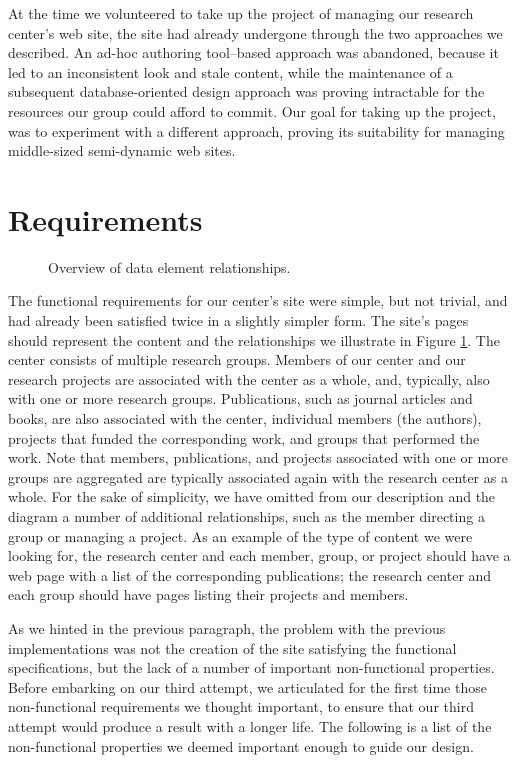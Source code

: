 \documentclass[10pt]{article}
\begin{document}
At the time we volunteered to take up the project of managing our
research center's web site, the site had already undergone through
the two approaches we described.
An ad-hoc authoring tool--based approach was abandoned,
because it led to an inconsistent look and stale content,
while the maintenance of a subsequent database-oriented
design approach was proving intractable for the resources
our group could afford to commit.
Our goal for taking up the project, was to experiment with a
different approach,
proving its suitability for managing middle-sized semi-dynamic
web sites.

\section{Requirements}
\label{sec:req}
\begin{figure}
\begin{center}
\leavevmode
{}
\end{center}
\caption{
\label{fig:diag}
Overview of data element relationships.}
\end{figure}
The functional requirements for our center's site were
simple, but not trivial, and had already been satisfied
twice in a slightly simpler form.
The site's pages should represent the content and the relationships
we illustrate in Figure \ref{fig:diag}.
The center consists of multiple research groups.
Members of our center and our research projects are
associated with the center as a whole, and, typically, also
with one or more research groups.
Publications, such as journal articles and books,
are also associated with the center, individual members (the authors),
projects that funded the corresponding work,
and groups that performed the work.
Note that members, publications, and projects associated
with one or more groups are aggregated are typically associated
again with the research center as a whole.
For the sake of simplicity,
we have omitted from our description and the diagram
a number of additional relationships,
such as the member directing a group or managing a project.
As an example of the type of content we were looking for,
the research center and
each member, group, or project should have a web page with a list
of the corresponding publications;
the research center and each group should have pages listing
their projects and members.

As we hinted in the previous paragraph, the problem with
the previous implementations was not the creation of the site
satisfying the functional specifications,
but the lack of a number of important non-functional properties.
Before embarking on our third attempt,
we articulated for the first time those non-functional requirements
we thought important, to ensure that our third attempt would produce
a result with a longer life.
The following is a list of the non-functional properties
we deemed important enough to guide our design.
\end{document}
